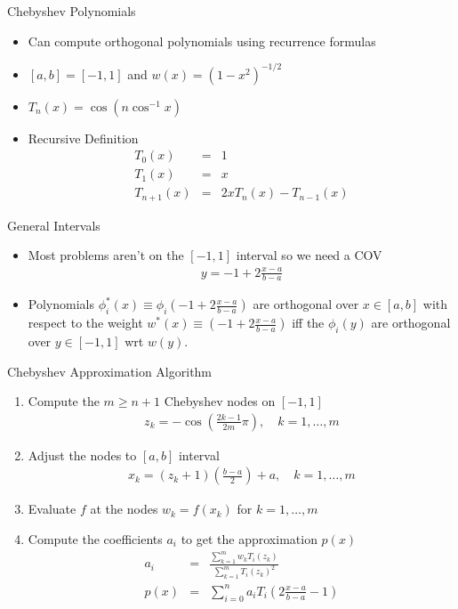 \documentclass[xcolor=pdftex,dvipsnames,table,mathserif,aspectratio=169]{beamer}
\begin{document}
\begin{frame}{Chebyshev Polynomials}
\begin{itemize}
\item Can compute orthogonal polynomials using recurrence formulas
\item $[a,b] = [-1,1]$ and $w(x) = (1-x^2)^{-1/2}$
\item $T_n(x) = \cos(n \cos^{-1} x)$
\item Recursive Definition 
\begin{eqnarray*}
T_0(x) &=& 1\\
T_1(x) &=& x\\
T_{n+1}(x) &=& 2x T_n(x) - T_{n-1}(x)
\end{eqnarray*}
\end{itemize}
\begin{block}{General Intervals}
\begin{itemize}
\item Most problems aren't on the $[-1,1]$ interval so we need a COV
\begin{eqnarray*}
y = -1 + 2 \frac{x-a}{b-a}
\end{eqnarray*}
\item Polynomials $\phi_i^{*}(x) \equiv \phi_i (-1 + 2 \frac{x-a}{b-a})$ are orthogonal over $x \in[a,b]$ with respect to the weight $w^{*}(x) \equiv (-1 + 2 \frac{x-a}{b-a})$ iff the $\phi_i(y)$ are orthogonal over $y\in[-1,1]$ wrt $w(y)$.
\end{itemize} 
\end{block}
\end{frame}

\begin{frame}{Chebyshev Approximation Algorithm}
\begin{enumerate}
\item Compute the $m \geq n+1$ Chebyshev nodes on $[-1,1]$
\begin{eqnarray*}
z_k = -\cos \left ( \frac{2k-1}{2m} \pi \right) , \quad k=1,\ldots,m
\end{eqnarray*}
\item Adjust the nodes to $[a,b]$ interval
\begin{eqnarray*}
x_k = (z_k + 1)\left(\frac{b-a}{2} \right) + a , \quad k=1,\ldots,m
\end{eqnarray*}
\item Evaluate $f$ at the nodes $w_k = f(x_k)$ for $ k=1,\ldots,m$
\item Compute the coefficients $a_i$ to get the approximation $p(x)$
\begin{eqnarray*}
a_i &=& \frac{\sum_{k=1}^m w_k T_i(z_k)}{\sum_{k=1}^m  T_i(z_k)^2} \\
p(x) &=& \sum_{i=0}^n a_i T_i \left( 2 \frac{x-a}{b-a} -1 \right) 
\end{eqnarray*}
\end{enumerate}
\end{frame}
\end{document}
